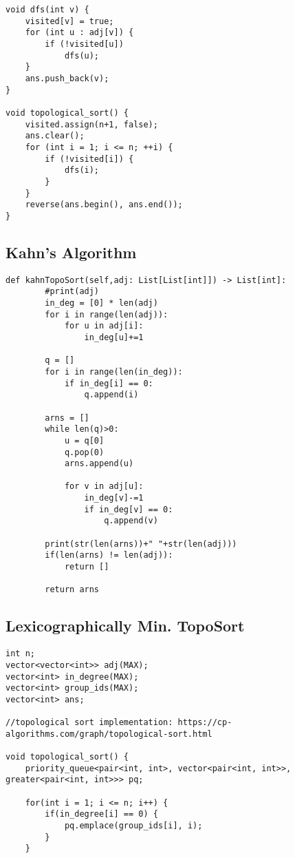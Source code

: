 \documentclass[10pt]{article}
\begin{document}
\begin{multicols*}{2}
\begin{lstlisting}[style=compactcpp]
void dfs(int v) {
    visited[v] = true;
    for (int u : adj[v]) {
        if (!visited[u])
            dfs(u);
    }
    ans.push_back(v);
}
 
void topological_sort() {
    visited.assign(n+1, false);
    ans.clear();
    for (int i = 1; i <= n; ++i) {
        if (!visited[i]) {
            dfs(i);
        }
    }
    reverse(ans.begin(), ans.end());
}
\end{lstlisting}

\subsection{Kahn's Algorithm}

\begin{lstlisting}[style=compactcpp]
def kahnTopoSort(self,adj: List[List[int]]) -> List[int]:
        #print(adj)
        in_deg = [0] * len(adj)
        for i in range(len(adj)):
            for u in adj[i]:
                in_deg[u]+=1
        
        q = []
        for i in range(len(in_deg)):
            if in_deg[i] == 0:
                q.append(i)

        arns = []
        while len(q)>0:
            u = q[0]
            q.pop(0)
            arns.append(u)

            for v in adj[u]:
                in_deg[v]-=1
                if in_deg[v] == 0:
                    q.append(v)

        print(str(len(arns))+" "+str(len(adj)))
        if(len(arns) != len(adj)): 
            return []

        return arns
\end{lstlisting}

\subsection{Lexicographically Min. TopoSort}

\begin{lstlisting}[style=compactcpp]
int n;
vector<vector<int>> adj(MAX);
vector<int> in_degree(MAX);
vector<int> group_ids(MAX);
vector<int> ans;

//topological sort implementation: https://cp-algorithms.com/graph/topological-sort.html

void topological_sort() {
    priority_queue<pair<int, int>, vector<pair<int, int>>, greater<pair<int, int>>> pq;

    for(int i = 1; i <= n; i++) {
        if(in_degree[i] == 0) {
            pq.emplace(group_ids[i], i);
        }
    }


\end{lstlisting}
\end{multicols*}
\end{document}
